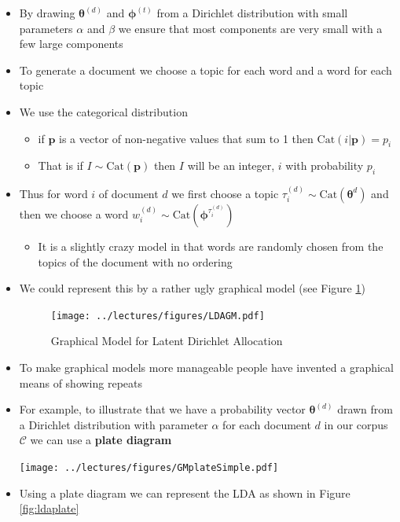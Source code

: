 \documentclass[11pt]{article}
\begin{document}
\begin{itemize}
\begin{itemize}
\begin{center}
\end{center}
\item By drawing \(\bm{\theta}^{(d)}\) and \(\bm{\phi}^{(t)}\) from a
Dirichlet distribution with small parameters \(\alpha\) and
\(\beta\) we ensure that most components are very small
with a few large components
\item To generate a document we choose a topic for each word and a
word for each topic
\item We use the categorical distribution
\begin{itemize}
\item if \(\bm{p}\) is a vector of non-negative values that sum to 1 then
\(\mathrm{Cat}(i|\bm{p}) = p_{i}\)
\item That is if \(I\sim\mathrm{Cat}(\bm{p})\) then \(I\) will be an integer, \(i\)
with probability \(p_{i}\)
\end{itemize}
\item Thus for word \(i\) of document \(d\) we first choose a topic
\(\tau_{i}^{(d)}\sim \mathrm{Cat}(\bm{\theta}^{d})\) and then we
choose a word \(w_{i}^{(d)} \sim
       \mathrm{Cat}(\bm{\phi}^{\tau_{i}^{(d)}})\)
\begin{itemize}
\item It is a slightly crazy model in that words are randomly
chosen from the topics of the document with no ordering
\end{itemize}
\item We could represent this by a rather ugly graphical model (see
Figure \ref{fig:ldagm})
\begin{figure}[htbp]
\centering
\texttt{[image: ../lectures/figures/LDAGM.pdf]}
\caption{Graphical Model for Latent Dirichlet Allocation \label{fig:ldagm}}
\end{figure}
\item To make graphical models more manageable people have invented a
graphical means of showing repeats
\item For example, to illustrate that we have a probability vector
\(\bm{\theta}^{(d)}\) drawn from a Dirichlet distribution with
parameter \(\alpha\) for each document \(d\) in our corpus
\(\mathcal{C}\) we can use a \textbf{plate diagram}
\begin{center}
\texttt{[image: ../lectures/figures/GMplateSimple.pdf]}
\end{center}
\item Using a plate diagram we can represent the LDA as shown in
Figure \ref{fig:ldaplate}
\begin{figure}[htbp]

\end{figure}
\end{itemize}
\end{itemize}
\end{document}
